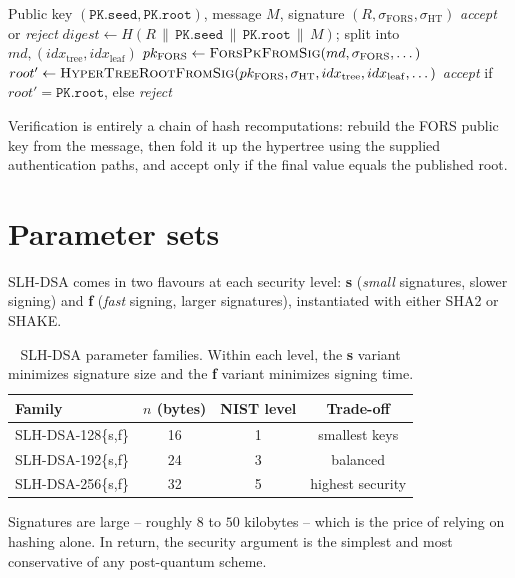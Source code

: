 \begin{algorithm}[H]
\caption{SLH-DSA.Verify (teaching form)}
\label{alg:slhdsa-verify}
\begin{algorithmic}[1]
\Require Public key $(\texttt{PK.seed},\texttt{PK.root})$, message $M$, signature $(R,\sigma_{\mathrm{FORS}},\sigma_{\mathrm{HT}})$
\Ensure \emph{accept} or \emph{reject}
\State $digest \gets H(R \,\|\, \texttt{PK.seed} \,\|\, \texttt{PK.root} \,\|\, M)$; split into $md,(idx_{\mathrm{tree}},idx_{\mathrm{leaf}})$
\State $pk_{\mathrm{FORS}} \gets \textsc{ForsPkFromSig}(md, \sigma_{\mathrm{FORS}}, \dots)$
\State $root' \gets \textsc{HyperTreeRootFromSig}(pk_{\mathrm{FORS}}, \sigma_{\mathrm{HT}}, idx_{\mathrm{tree}}, idx_{\mathrm{leaf}}, \dots)$
\State \Return \emph{accept} if $root' = \texttt{PK.root}$, else \emph{reject}
\end{algorithmic}
\end{algorithm}

Verification is entirely a chain of hash recomputations: rebuild the FORS public key from the message, then fold it up the hypertree using the supplied authentication paths, and accept only if the final value equals the published root.

\section{Parameter sets}

SLH-DSA comes in two flavours at each security level: \textbf{s} (\emph{small} signatures, slower signing) and \textbf{f} (\emph{fast} signing, larger signatures), instantiated with either SHA2 or SHAKE.

\begin{table}[H]
\centering
\begin{tabular}{lccc}
\toprule
Family & $n$ (bytes) & NIST level & Trade-off \\
\midrule
SLH-DSA-128\{s,f\} & 16 & 1 & smallest keys \\
SLH-DSA-192\{s,f\} & 24 & 3 & balanced \\
SLH-DSA-256\{s,f\} & 32 & 5 & highest security \\
\bottomrule
\end{tabular}
\caption{SLH-DSA parameter families. Within each level, the \textbf{s} variant minimizes signature size and the \textbf{f} variant minimizes signing time.}
\end{table}

Signatures are large -- roughly $8$ to $50$ kilobytes -- which is the price of relying on hashing alone. In return, the security argument is the simplest and most conservative of any post-quantum scheme.

